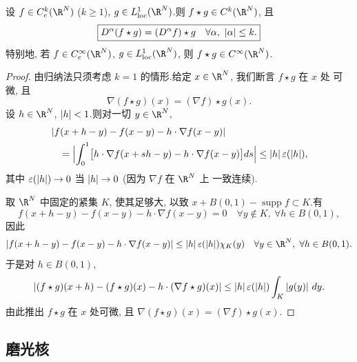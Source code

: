 \begin{keyproposition}
\label{prop:4.20}
设 $f\in C_c^k(\R^N)$ ($k\ge1$), $g\in L^1_{\mathrm{loc}}(\R^N)$.则
$f\star g\in C^k(\R^N)$, 且
\begin{equation*}
\boxed{D^\alpha(f\star g)=(D^\alpha f)\star g\quad\forall\alpha,\
\left|\alpha\right|\le k.}
\end{equation*}
特别地, 若 $f\in C_c^\infty(\R^N)$, $g\in L^1_{\mathrm{loc}}(\R^N)$, 则
$f\star g\in C^\infty(\R^N)$.
\end{keyproposition}

\begin{proof}
由归纳法只须考虑 $k=1$ 的情形.给定 $x\in\R^N$, 我们断言 $f\star g$ 在 $x$ 处
可微, 且
\begin{equation*}
\nabla(f\star g)(x)=(\nabla f)\star g(x).
\end{equation*}
设 $h\in\R^N$, $\left|h\right|<1$.则对一切 $y\in\R^N$,
\begin{equation*}
\begin{aligned}
&\left|f(x+h-y)-f(x-y)-h\cdot\nabla f(x-y)\right|\\
&\quad=\Bigl|\int_0^1\bigl[h\cdot\nabla f(x+sh-y)-h\cdot\nabla f(x-y)\bigr]ds
\Bigr|\le\left|h\right|\varepsilon(\left|h\right|),
\end{aligned}
\end{equation*}
其中 $\varepsilon(\left|h\right|)\to0$ 当 $\left|h\right|\to0$ (因为 $\nabla f$ 在 $\R^N$ 上
一致连续).

取 $\R^N$ 中固定的紧集 $K$, 使其足够大, 以致
$x+B(0,1)-\operatorname{supp}f\subset K$.有
\begin{equation*}
f(x+h-y)-f(x-y)-h\cdot\nabla f(x-y)=0\quad\forall y\notin K,\
\forall h\in B(0,1),
\end{equation*}
因此
\begin{equation*}
\abs{f(x+h-y)-f(x-y)-h\cdot\nabla f(x-y)}\le\abs{h}\varepsilon(\abs{h})\chi_K(y)
\quad\forall y\in\R^N,\ \forall h\in B(0,1).
\end{equation*}
于是对 $h\in B(0,1)$,
\begin{equation*}
\left|(f\star g)(x+h)-(f\star g)(x)-h\cdot(\nabla f\star g)(x)\right|
\le\left|h\right|\varepsilon(\left|h\right|)\int_K\left|g(y)\right|\,dy.
\end{equation*}
由此推出 $f\star g$ 在 $x$ 处可微, 且
$\nabla(f\star g)(x)=(\nabla f)\star g(x)$.
\end{proof}

\subsection*{磨光核}


